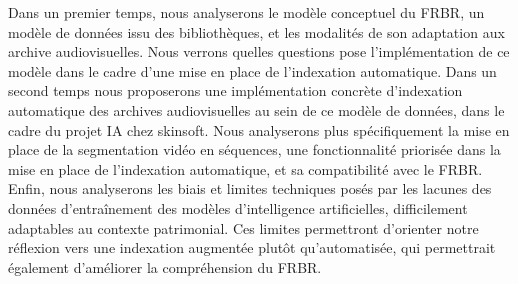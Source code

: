 	Dans un premier temps, nous analyserons le modèle conceptuel du FRBR, un modèle de données issu des bibliothèques, et les modalités de son adaptation aux archive audiovisuelles. Nous verrons quelles questions pose l'implémentation de ce modèle dans le cadre d'une mise en place de l'indexation automatique. Dans un second temps nous proposerons une implémentation concrète d'indexation automatique des archives audiovisuelles au sein de ce modèle de données, dans le cadre du projet IA chez skinsoft. Nous analyserons plus spécifiquement la mise en place de la segmentation vidéo en séquences, une fonctionnalité priorisée dans la mise en place de l'indexation automatique, et sa compatibilité avec le FRBR. Enfin, nous analyserons les biais et limites techniques posés par les lacunes des données d'entraînement des modèles d'intelligence artificielles, difficilement adaptables au contexte patrimonial. Ces limites permettront d'orienter notre réflexion vers une indexation augmentée plutôt qu'automatisée, qui permettrait également d'améliorer la compréhension du FRBR.
	

 


